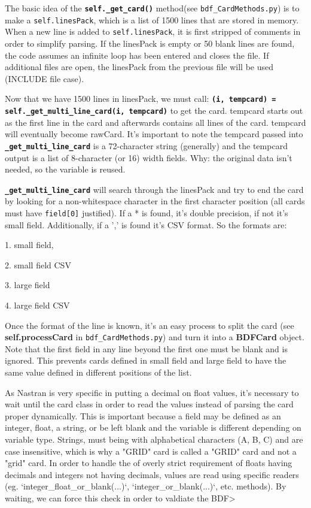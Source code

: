      The basic idea of the {\bf \tt self.\_get\_card()} method(see {\tt bdf\_CardMethods.py}) is to make a {\tt self.linesPack}, which is a list of 1500 lines that are stored in memory.  When a new line is added to {\tt self.linesPack}, it is first stripped of comments in order to simplify parsing.  If the linesPack is empty or 50 blank lines are found, the code assumes an infinite loop has been entered and closes the file.  If additional files are open, the linesPack from the previous file will be used (INCLUDE file case).
     
     Now that we have 1500 lines in linesPack, we must call:  {\bf \tt (i, tempcard) = self.\_get\_multi\_line\_card(i, tempcard)} to get the card.  tempcard starts out as the first line in the card and afterwards contains all lines of the card. tempcard will eventually become rawCard.  It's important to note the tempcard passed into {\bf \tt \_get\_multi\_line\_card} is a 72-character string (generally) and the tempcard output is a list of 8-character (or 16) width fields.  Why: the original data isn't needed, so the variable is reused.
     
     {\bf \tt \_get\_multi\_line\_card} will search through the linesPack and try to end the card by looking for a non-whitespace character in the first character position (all cards must have {\tt field[0]} justified).  If a * is found, it's double precision, if not it's small field.  Additionally, if a ',' is found it's CSV format.  So the formats are:

       1. small field,

       2. small field CSV

       3. large field

       4. large field CSV
     
     Once the format of the line is known, it's an easy process to split the card (see {\bf self.processCard} in {\tt bdf\_CardMethods.py}) and turn it into a {\bf BDFCard} object.  Note that the first field in any line beyond the first one must be blank and is ignored.  This prevents cards defined in small field and large field to have the same value defined in different positions of the list.
     
     As Nastran is very specific in putting a decimal on float values, it's necessary to wait until the card class in order to read the values instead of parsing the card proper dynamically.  This is important because a field may be defined as an integer, float, a string, or be left blank and the variable is different depending on variable type.  Strings, must being with alphabetical characters (A, B, C) and are case insensitive, which is why a "GRID" card is called a "GRID" card and not a "grid" card.  In order to handle the of overly strict requirement of floats having decimals and integers not having decimals, values are read using specific readers (eg. `integer_float_or_blank(...)`, `integer_or_blank(...)`, etc. methods).  By waiting, we can force this check in order to valdiate the BDF>
     
